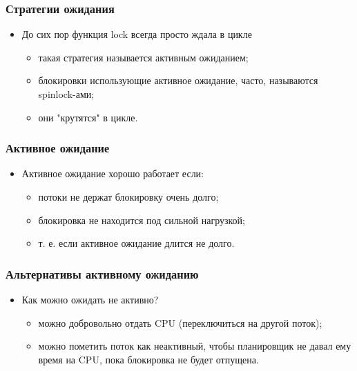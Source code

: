 \begin{frame}
\frametitle{Стратегии ожидания}
\begin{itemize}
    \item<1->До сих пор функция lock всегда просто ждала в цикле
    \begin{itemize}
        \item<2->такая стратегия называется активным ожиданием;
        \item<3->блокировки использующие активное ожидание, часто, называются
             spinlock-ами;
        \item<3->они "крутятся" в цикле.
    \end{itemize}
\end{itemize}
\end{frame}

\begin{frame}
\frametitle{Активное ожидание}
\begin{itemize}
    \item<1->Активное ожидание хорошо работает если:
    \begin{itemize}
        \item<2->потоки не держат блокировку очень долго;
        \item<3->блокировка не находится под сильной нагрузкой;
        \item<4->т. е. если активное ожидание длится не долго.
    \end{itemize}
\end{itemize}
\end{frame}

\begin{frame}
\frametitle{Альтернативы активному ожиданию}
\begin{itemize}
    \item<1->Как можно ожидать не активно?
    \begin{itemize}
        \item<2->можно добровольно отдать CPU (переключиться на другой поток);
        \item<3->можно пометить поток как неактивный, чтобы планировщик не
             давал ему время на CPU, пока блокировка не будет отпущена.
    \end{itemize}
\end{itemize}
\end{frame}
